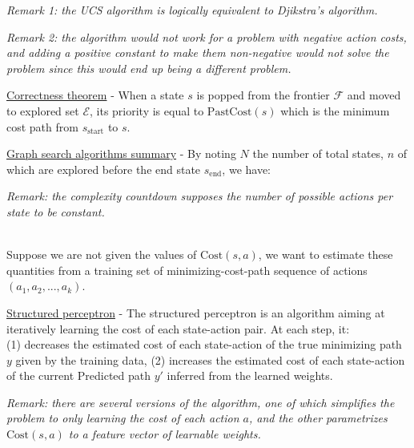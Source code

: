 \documentclass[4pt,landscape]{article}
\begin{document}
\begin{multicols*}{4}
{\textit{Remark 1: the UCS algorithm is logically equivalent to Djikstra's algorithm.}}\par
{\textit{Remark 2: the algorithm would not work for a problem with negative action costs, and adding a positive constant to make them non-negative would not solve the problem since this would end up being a different problem.}}\par

{\underline{Correctness theorem} - When a state $s$ is popped from the frontier $\mathcal{F}$ and moved to explored set $\mathcal{E}$, its priority is equal to $\textrm{PastCost}(s)$ which is the minimum cost path from $s_\textrm{start}$ to $s$.}\par

{\underline{Graph search algorithms summary} - By noting $N$ the number of total states, $n$ of which are explored before the end state $s_\textrm{end}$, we have:}\par




{\tiny \textit{Remark: the complexity countdown supposes the number of possible actions per state to be constant.}}\par

{\color{cyan} \hrulefill}\\
{Suppose we are not given the values of $\textrm{Cost}(s,a)$, we want to estimate these quantities from a training set of minimizing-cost-path sequence of actions $(a_1, a_2, ..., a_k)$.}\par
{\underline{Structured perceptron} - The structured perceptron is an algorithm aiming at iteratively learning the cost of each state-action pair. At each step, it:\\
(1) decreases the estimated cost of each state-action of the true minimizing path $y$ given by the training data,
(2) increases the estimated cost of each state-action of the current Predicted path $y'$ inferred from the learned weights.}\par
{\textit{Remark: there are several versions of the algorithm, one of which simplifies the problem to only learning the cost of each action $a$, and the other parametrizes $\textrm{Cost}(s,a)$ to a feature vector of learnable weights.}}\par


\end{multicols*}
\end{document}
